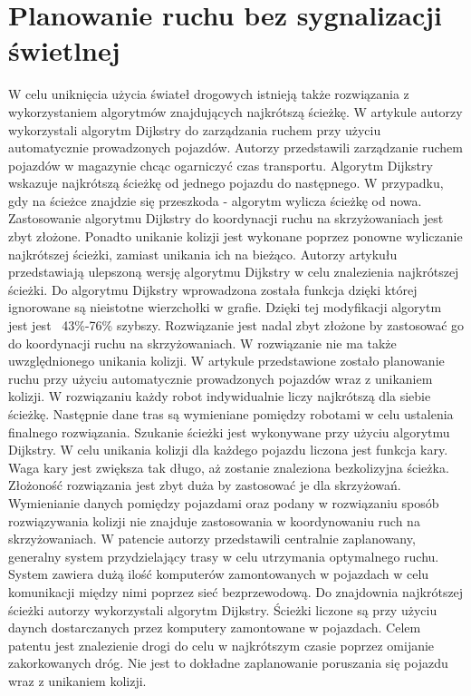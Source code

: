 \section{Planowanie ruchu bez sygnalizacji świetlnej}

W celu uniknięcia użycia świateł drogowych istnieją także rozwiązania z wykorzystaniem algorytmów znajdujących najkrótszą ścieżkę. W artykule \cite{shaikh2013agv} autorzy wykorzystali algorytm Dijkstry do zarządzania ruchem przy użyciu automatycznie prowadzonych pojazdów. Autorzy przedstawili zarządzanie ruchem pojazdów w magazynie chcąc ogarniczyć czas transportu. Algorytm Dijkstry wskazuje najkrótszą ścieżkę od jednego pojazdu do następnego. W przypadku, gdy na ścieżce znajdzie się przeszkoda - algorytm wylicza ścieżkę od nowa. Zastosowanie algorytmu Dijkstry do koordynacji ruchu na skrzyżowaniach jest zbyt złożone. Ponadto unikanie kolizji jest wykonane poprzez ponowne wyliczanie najkrótszej ścieżki, zamiast unikania ich na bieżąco.
\newline
\indent
Autorzy artykułu \cite{huang2013improved} przedstawiają ulepszoną wersję algorytmu Dijkstry w celu znalezienia najkrótszej ścieżki. Do algorytmu Dijkstry wprowadzona została funkcja dzięki której ignorowane są nieistotne wierzchołki w grafie. Dzięki tej modyfikacji algorytm jest jest ~43\%-76\% szybszy. Rozwiązanie jest nadal zbyt złożone by zastosować go do koordynacji ruchu na skrzyżowaniach. W rozwiązanie nie ma także uwzględnionego unikania kolizji.
\newline
\indent
W artykule \cite{ando2003autonomous} przedstawione zostało planowanie ruchu przy użyciu automatycznie prowadzonych pojazdów wraz z unikaniem kolizji. W rozwiązaniu każdy robot indywidualnie liczy najkrótszą dla siebie ścieżkę. Następnie dane tras są wymieniane pomiędzy robotami w celu ustalenia finalnego rozwiązania. Szukanie ścieżki jest wykonywane przy użyciu algorytmu Dijkstry. W celu unikania kolizji dla każdego pojazdu liczona jest funkcja kary. Waga kary jest zwiększa tak długo, aż zostanie znaleziona bezkolizyjna ścieżka. Złożoność rozwiązania jest zbyt duża by zastosować je dla skrzyżowań. Wymienianie danych pomiędzy pojazdami oraz podany w rozwiązaniu sposób rozwiązywania kolizji nie znajduje zastosowania w koordynowaniu ruch na skrzyżowaniach.
\newline
\indent
W patencie \cite{gazis1997optimal} autorzy przedstawili centralnie zaplanowany, generalny system przydzielający trasy w celu utrzymania optymalnego ruchu. System zawiera dużą ilość komputerów zamontowanych w pojazdach w celu komunikacji między nimi poprzez sieć bezprzewodową. Do znajdownia najkrótszej ścieżki autorzy wykorzystali algorytm Dijkstry. Ścieżki liczone są przy użyciu daynch dostarczanych przez komputery zamontowane w pojazdach. Celem patentu jest znalezienie drogi do celu w najkrótszym czasie poprzez omijanie zakorkowanych dróg. Nie jest to dokładne zaplanowanie poruszania się pojazdu wraz z unikaniem kolizji.
